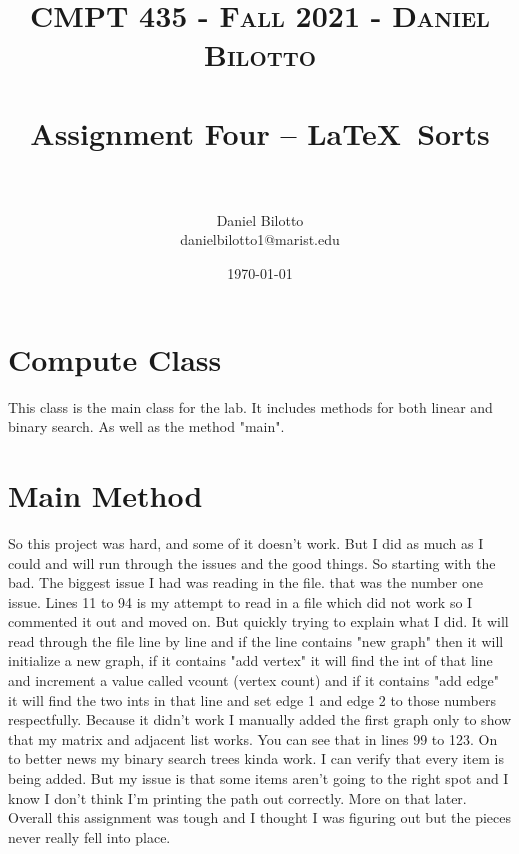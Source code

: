 \documentclass[letterpaper, 10pt]{article}
\title{	
   \normalfont \normalsize 
   \textsc{CMPT 435 - Fall 2021 - Daniel Bilotto} \\[10pt] %
   \horrule{0.5pt} \\[0.25cm] 	%
   \huge Assignment Four -- \LaTeX ~Sorts \\     	    %
   \horrule{0.5pt} \\[0.25cm] 	%
}
\author{Daniel Bilotto \\ \normalsize danielbilotto1@marist.edu}
\date{\normalsize\today} 	%
\begin{document}
\maketitle %



\section{Compute Class}
This class is the main class for the lab. It includes methods for both linear and binary search. As well as the method "main".
\section{Main Method}
So this project was hard, and some of it doesn't work. But I did as much as I could and will run through the issues and the good things. So starting with the bad. The biggest issue I had was reading in the file. that was the number one issue. Lines 11 to 94 is my attempt to read in a file which did not work so I commented it out and moved on. But quickly trying to explain what I did. It will read through the file line by line and if the line contains "new graph" then it will initialize a new graph, if it contains "add vertex" it will find the int of that line and increment a value called vcount (vertex count) and if it contains "add edge" it will find the two ints in that line and set edge 1 and edge 2 to those numbers respectfully.
Because it didn't work I manually added the first graph only to show that my matrix and adjacent list works. You can see that in lines 99 to 123. On to better news my binary search trees kinda work. I can verify that every item is being added. But my issue is that some items aren't going to the right spot and I know I don't think I'm printing the path out correctly. More on that later. Overall this assignment was tough and I thought I was figuring out but the pieces never really fell into place.
\end{document}
